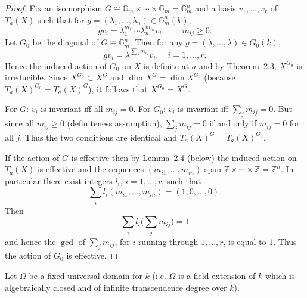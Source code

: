 \documentclass[12pt]{article}
\begin{document}
\begin{proof}
Fix an isomorphism $G \cong \mathbb{G}_m \times \cdots \times \mathbb{G}_m = \mathbb{G}_m^n$ and a basis $v_1, \dots, v_r$ of $T_a(X)$ such that for $g=(\lambda_1, \dots, \lambda_n)\in \mathbb{G}_m^n(k)$,
\[
   g v_i = \lambda_1^{m_{i1}} \cdots \lambda_n^{m_{in}} v_i, \qquad m_{ij} \geq 0.
\]
Let $G_0$ be the diagonal of $G \cong \mathbb{G}_m^n$.  
Then for any $g=(\lambda, \dots, \lambda)\in G_0(k)$,
\[
   g v_i = \lambda^{\sum_j m_{ij}} v_i, \quad i=1,\dots,r.
\]
Hence the induced action of $G_0$ on $X$ is definite at $a$ and by Theorem~2.3, $X^{G_0}$ is irreducible.  
Since $X^{G_0} \subset X^G$ and $\dim X^G = \dim X^{G_0}$ (because $T_a(X)^{G_0} = T_a(X)^G$), it follows that $X^{G_0} = X^G$.

\begin{remark}
     For $G$: $v_i$ is invariant iff all $m_{ij}=0$. For $G_0$: $v_i$ is invariant iff $\sum_j m_{ij}=0$. But since all $m_{ij}\ge 0$ (definiteness assumption), $\sum_j m_{ij}=0$ if and only if $m_{ij}=0$ for all $j$. Thus the two conditions are identical and $T_a(X)^G = T_a(X)^{G_0}$.
\end{remark}

If the action of $G$ is effective then by Lemma~2.4 (below) the induced action on $T_a(X)$ is effective and the sequences $(m_{i1}, \dots, m_{in})$ span $\mathbb{Z} \times \cdots \times \mathbb{Z} = \mathbb{Z}^n$.  
In particular there exist integers $l_i$, $i=1,\dots,r$, such that
\[
   \sum_i l_i (m_{i1}, \dots, m_{in}) = (1,0,\dots,0).
\]
Then
\[
   \sum_i l_i \Big( \sum_j m_{ij} \Big) = 1
\]
and hence the $\gcd$ of $\sum_j m_{ij}$, for $i$ running through $1,\dots,r$, is equal to $1$.  
Thus the action of $G_0$ is effective.
\end{proof}

Let $\Omega$ be a fixed universal domain for $k$ (i.e. $\Omega$ is a field extension of $k$ which is algebraically closed and of infinite transcendence degree over $k$).
\end{document}
